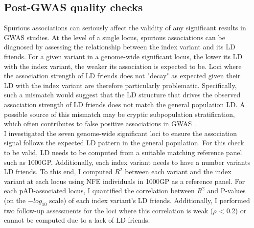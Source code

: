     \subsection{Post-GWAS quality checks}
    Spurious associations can seriously affect the validity of any significant results in GWAS studies. At the level of a single locus,  spurious associations can be diagnosed by assessing the relationship between the index variant and its LD friends. For a given variant in a genome-wide significant locus, the lower its LD with the index variant, the weaker its association is expected to be. Loci where the association strength of LD friends does not "decay" as expected given their LD with the index variant are therefore particularly problematic. Specifically, such a mismatch would suggest that the LD structure that drives the observed association strength of LD friends does not match the general population LD. A possible source of this mismatch may be cryptic subpopulation stratification, which often contributes to false positive associations in GWAS \cite{Hellwege2017-xf}. \\ 
    
    I investigated the seven genome-wide significant loci to ensure the association signal follows the expected LD pattern in the general population. For this check to be valid, LD needs to be computed from a suitable matching reference panel such as 1000GP. Additionally, each index variant needs to have a number variants LD friends. To this end, I computed $R^{2}$ between each variant and the index variant at each locus using NFE individuals in 1000GP as a reference panel. For each pAD-associated locus, I quantified the correlation between $R^{2}$ and P-values (on the $-log_{10}$ scale) of each index variant's LD friends. Additionally, I performed two follow-up assessments for the loci where this correlation is weak ($\rho$ < 0.2) or cannot be computed due to a lack of LD friends. \\

    
    
